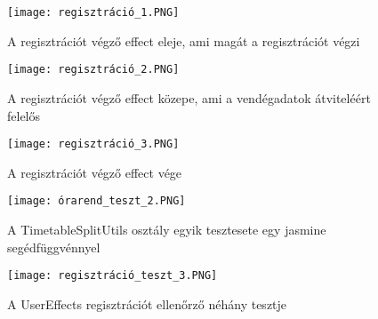 \documentclass[a4paper,12pt]{report}
\begin{document}
\begin{figure}[h]
    \centering
    \texttt{[image: regisztráció\_1.PNG]}
    \caption{A regisztrációt végző effect eleje, ami magát a regisztrációt végzi}
    \label{fig:UserEffectsRegister1}
\end{figure}

\begin{figure}[h]
    \centering
    \texttt{[image: regisztráció\_2.PNG]}
    \caption{A regisztrációt végző effect közepe, ami a vendégadatok átviteléért felelős}
    \label{fig:UserEffectsRegister2}
\end{figure}

\begin{figure}[h]
    \centering
    \texttt{[image: regisztráció\_3.PNG]}
    \caption{A regisztrációt végző effect vége}
    \label{fig:UserEffectsRegister3}
\end{figure}

\begin{figure}[h]
    \centering
    \texttt{[image: órarend\_teszt\_2.PNG]}
    \caption{A TimetableSplitUtils osztály egyik tesztesete egy jasmine segédfüggvénnyel}
    \label{fig:TimetableSplitUtilsTestJasmineAny}
\end{figure}

\begin{figure}[h]
    \centering
    \texttt{[image: regisztráció\_teszt\_3.PNG]}
    \caption{A UserEffects regisztrációt ellenőrző néhány tesztje}
    \label{fig:UserEffectsSpecRegister}
\end{figure}
\end{document}
